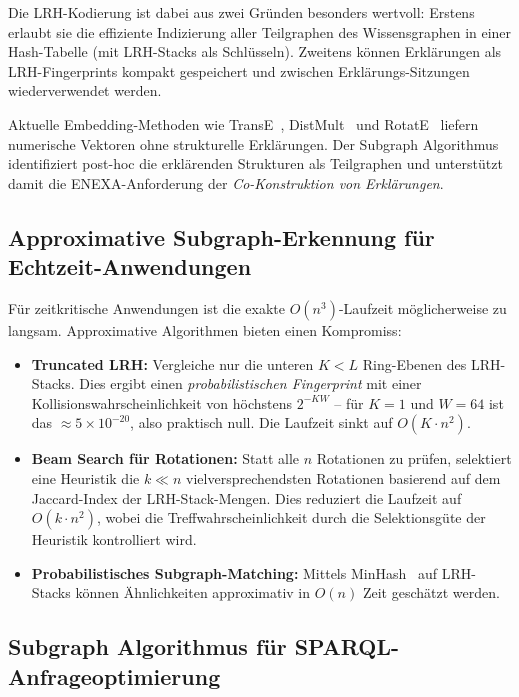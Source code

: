 ﻿\documentclass[a4paper,12pt]{article}
\theoremstyle{definition}
\begin{document}
Die LRH-Kodierung ist dabei aus zwei Gründen besonders wertvoll: Erstens erlaubt
sie die effiziente Indizierung aller Teilgraphen des Wissensgraphen in einer
Hash-Tabelle (mit LRH-Stacks als Schlüsseln). Zweitens können Erklärungen als
LRH-Fingerprints kompakt gespeichert und zwischen Erklärungs-Sitzungen
wiederverwendet werden.

Aktuelle Embedding-Methoden wie TransE~\cite{bordes2013}, DistMult~\cite{yang2014}
und RotatE~\cite{sun2019} liefern numerische Vektoren ohne strukturelle Erklärungen.
Der Subgraph Algorithmus identifiziert post-hoc die erklärenden Strukturen als
Teilgraphen und unterstützt damit die ENEXA-Anforderung der \emph{Co-Konstruktion
von Erklärungen}.

\subsection{Approximative Subgraph-Erkennung für Echtzeit-Anwendungen}

Für zeitkritische Anwendungen ist die exakte $O(n^3)$-Laufzeit möglicherweise zu
langsam. Approximative Algorithmen bieten einen Kompromiss:

\begin{itemize}
  \item \textbf{Truncated LRH:} Vergleiche nur die unteren $K < L$ Ring-Ebenen
        des LRH-Stacks. Dies ergibt einen \emph{probabilistischen Fingerprint}
        mit einer Kollisionswahrscheinlichkeit von höchstens $2^{-KW}$ -- für
        $K=1$ und $W=64$ ist das $\approx 5 \times 10^{-20}$, also praktisch null.
        Die Laufzeit sinkt auf $O(K \cdot n^2)$.

  \item \textbf{Beam Search für Rotationen:} Statt alle $n$ Rotationen zu prüfen,
        selektiert eine Heuristik die $k \ll n$ vielversprechendsten Rotationen
        basierend auf dem Jaccard-Index der LRH-Stack-Mengen. Dies reduziert die
        Laufzeit auf $O(k \cdot n^2)$, wobei die Treffwahrscheinlichkeit durch die
        Selektionsgüte der Heuristik kontrolliert wird.

  \item \textbf{Probabilistisches Subgraph-Matching:} Mittels MinHash~\cite{broder1997}
        auf LRH-Stacks können Ähnlichkeiten approximativ in $O(n)$ Zeit geschätzt werden.
\end{itemize}

\subsection{Subgraph Algorithmus für SPARQL-Anfrageoptimierung}
\end{document}
